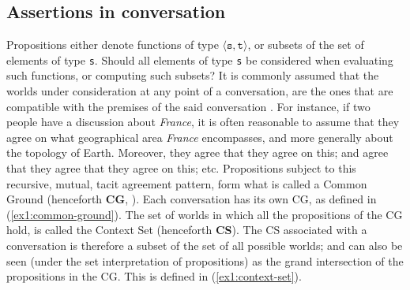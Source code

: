 \subsection{Assertions in conversation}
Propositions either denote functions of type $\langle \texttt{s}, \texttt{t}\rangle$, or subsets of the set of elements of type \texttt{s}. Should all elements of type \texttt{s} be considered when evaluating such functions, or computing such subsets? It is commonly assumed that the worlds under consideration at any point of a conversation, are the ones that are compatible with the premises of the said conversation \parencite{Stalnaker1974,Stalnaker1978}. For instance, if two people have a discussion about \textit{France}, it is often reasonable to assume that they agree on what geographical area \textit{France} encompasses, and more generally about the topology of Earth. Moreover, they agree that they agree on this; and agree that they agree that they agree on this; etc. Propositions subject to this recursive, mutual, tacit agreement pattern, form what is called a Common Ground (henceforth \textbf{CG}, \parencite{Stalnaker1978}). Each conversation has its own CG, as defined in (\ref{ex1:common-ground}). The set of worlds in which all the propositions of the CG hold, is called the Context Set (henceforth \textbf{CS}). The CS associated with a conversation is therefore a subset of the set of all possible worlds; and can also be seen (under the set interpretation of propositions) as the grand intersection of the propositions in the CG. This is defined in (\ref{ex1:context-set}).

\begin{exe}
	\label{ex1:common-ground}
	 \label{ex1:context-set}
\end{exe}


